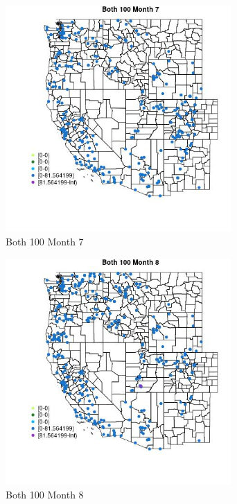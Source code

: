 \begin{figure} 
\centering  
\includegraphics[width=0.77\textwidth]{Code_Outputs/Report_ML_input_PM25_Step4_part_e_de_duplicated_aveswNAs_MapObsMo7Both_100.jpg} 
\caption{\label{fig:Report_ML_input_PM25_Step4_part_e_de_duplicated_aveswNAsMapObsMo7Both_100}Both 100 Month 7} 
\end{figure} 
 

\begin{figure} 
\centering  
\includegraphics[width=0.77\textwidth]{Code_Outputs/Report_ML_input_PM25_Step4_part_e_de_duplicated_aveswNAs_MapObsMo8Both_100.jpg} 
\caption{\label{fig:Report_ML_input_PM25_Step4_part_e_de_duplicated_aveswNAsMapObsMo8Both_100}Both 100 Month 8} 
\end{figure} 
 

